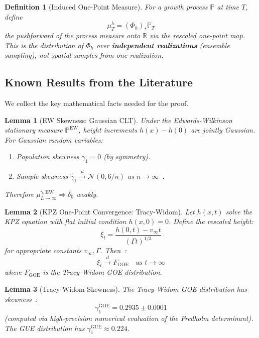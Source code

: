 \documentclass[aps,pre,reprint,amsmath,amssymb,superscriptaddress]{revtex4-2}
\newtheorem{definition}{Definition}
\newtheorem{lemma}{Lemma}
\newcommand{\EW}{\text{EW}}
\newcommand{\bbP}{\mathbb{P}}
\newcommand{\bbR}{\mathbb{R}}
\begin{document}
\begin{definition}[Induced One-Point Measure]
For a growth process $\bbP$ at time $T$, define
\begin{equation}
\mu^{h}_{T} = (\Phi_h)_* \bbP_{T}
\end{equation}
the pushforward of the process measure onto $\bbR$ via the rescaled one-point map. This is the distribution of $\Phi_h$ over \textbf{independent realizations} (ensemble sampling), not spatial samples from one realization.
\end{definition}

\subsection{Known Results from the Literature}

We collect the key mathematical facts needed for the proof.

\begin{lemma}[EW Skewness: Gaussian CLT]
\label{lem:EW-skewness}
Under the Edwards-Wilkinson stationary measure $\bbP^{\EW}$, height increments $h(x) - h(0)$ are jointly Gaussian. For Gaussian random variables:
\begin{enumerate}
\item Population skewness $\gamma_1 = 0$ (by symmetry).
\item Sample skewness $\hat{\gamma}_1 \xrightarrow{d} \mathcal{N}(0, 6/n)$ as $n \to \infty$~\cite{JoanesBrown1998}.
\end{enumerate}
Therefore $\mu^{\gamma,\EW}_{L \to \infty} \Rightarrow \delta_0$ weakly.
\end{lemma}

\begin{lemma}[KPZ One-Point Convergence: Tracy-Widom]
\label{lem:KPZ-TW}
Let $h(x,t)$ solve the KPZ equation with flat initial condition $h(x,0) = 0$. Define the rescaled height:
\begin{equation}
\xi_t = \frac{h(0,t) - v_\infty t}{(\Gamma t)^{1/3}}
\end{equation}
for appropriate constants $v_\infty, \Gamma$. Then~\cite{CorwinQuastel2013,SasamotoSpohn2010}:
\begin{equation}
\xi_t \xrightarrow{d} F_{\text{GOE}} \quad \text{as } t \to \infty
\end{equation}
where $F_{\text{GOE}}$ is the Tracy-Widom GOE distribution.
\end{lemma}

\begin{lemma}[Tracy-Widom Skewness]
\label{lem:TW-skewness}
The Tracy-Widom GOE distribution has skewness~\cite{TracyWidom1996,Bornemann2010}:
\begin{equation}
\gamma_1^{\text{GOE}} = 0.2935 \pm 0.0001
\end{equation}
(computed via high-precision numerical evaluation of the Fredholm determinant). The GUE distribution has $\gamma_1^{\text{GUE}} \approx 0.224$.
\end{lemma}
\end{document}
